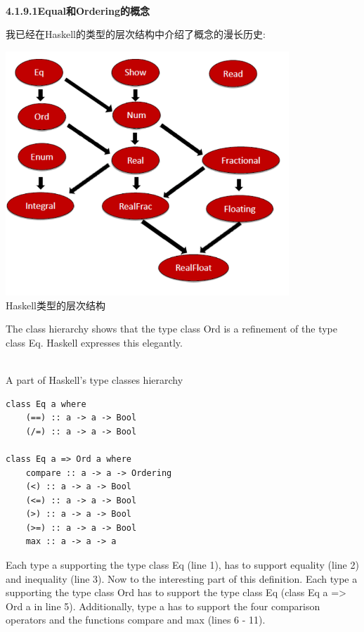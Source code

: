 \hspace*{\fill} \\ %
\noindent
\textbf{4.1.9.1\hspace{0.2cm}Equal和Ordering的概念}

我已经在Haskell的类型的层次结构中介绍了概念的漫长历史:

\begin{center}
\includegraphics[width=0.8\textwidth]{content/3/chapter4/images/9.png}\\
Haskell类型的层次结构
\end{center}

The class hierarchy shows that the type class Ord is a refinement of the type class Eq. Haskell expresses this elegantly.

\hspace*{\fill} \\ %
\noindent
A part of Haskell’s type classes hierarchy
\begin{lstlisting}[style=styleCXX]
class Eq a where
	(==) :: a -> a -> Bool
	(/=) :: a -> a -> Bool

class Eq a => Ord a where
	compare :: a -> a -> Ordering
	(<) :: a -> a -> Bool
	(<=) :: a -> a -> Bool
	(>) :: a -> a -> Bool
	(>=) :: a -> a -> Bool
	max :: a -> a -> a
\end{lstlisting}

Each type a supporting the type class Eq (line 1), has to support equality (line 2) and inequality (line 3). Now to the interesting part of this definition. Each type a supporting the type class Ord has to support the type class Eq (class Eq a => Ord a in line 5). Additionally, type a has to support the four comparison operators and the functions compare and max (lines 6 - 11).

